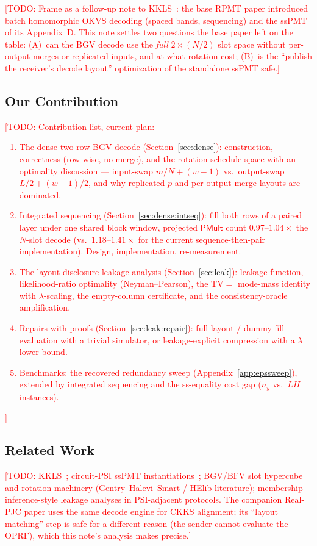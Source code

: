 \documentclass[runningheads]{llncs}
\newcommand{\TODO}[1]{\textcolor{red}{[TODO: #1]}}
\newcommand{\PMult}{\mathsf{PMult}}          %
\newcommand{\band}{w}                        %
\newcommand{\half}{H}                        %
\newcommand{\TV}{\mathrm{TV}}
\begin{document}
\TODO{Frame as a follow-up note to KKLS~\cite{EPRINT:KwaKwoLeeSon26}: the base RPMT
paper introduced batch homomorphic OKVS decoding (spaced bands, sequencing) and the
ssPMT of its Appendix~D. This note settles two questions the base paper left on the
table: (A)~can the BGV decode use the \emph{full} $2\times(N/2)$ slot space without
per-output merges or replicated inputs, and at what rotation cost; (B)~is the
``publish the receiver's decode layout'' optimization of the standalone ssPMT safe.}

\subsection{Our Contribution}
\label{sec:intro:contrib}

\TODO{Contribution list, current plan:
\begin{enumerate}
  \item The dense two-row BGV decode (Section~\ref{sec:dense}): construction,
  correctness (row-wise, no merge), and the rotation-schedule space with an
  optimality discussion --- input-swap $m/N+(\band{-}1)$ vs.\ output-swap
  $L/2+(\band{-}1)/2$, and why replicated-$p$ and per-output-merge layouts are
  dominated.
  \item Integrated sequencing (Section~\ref{sec:dense:intseq}): fill both rows of a
  paired layer under one shared block window, projected $\PMult$ count
  $0.97$--$1.04\times$ the $N$-slot decode (vs.\ $1.18$--$1.41\times$ for the current
  sequence-then-pair implementation). Design, implementation, re-measurement.
  \item The layout-disclosure leakage analysis (Section~\ref{sec:leak}): leakage
  function, likelihood-ratio optimality (Neyman--Pearson), the
  $\TV=$ mode-mass identity with $\lambda$-scaling, the empty-column certificate, and
  the consistency-oracle amplification.
  \item Repairs with proofs (Section~\ref{sec:leak:repair}): full-layout /
  dummy-fill evaluation with a trivial simulator, or leakage-explicit compression
  with a $\lambda$ lower bound.
  \item Benchmarks: the recovered redundancy sweep (Appendix~\ref{app:epssweep}),
  extended by integrated sequencing and the ss-equality cost gap ($n_y$ vs.\
  $L\half$ instances).
\end{enumerate}}

\subsection{Related Work}
\label{sec:intro:related}
\TODO{KKLS~\cite{EPRINT:KwaKwoLeeSon26}; circuit-PSI ssPMT
instantiations~\cite{EC:PSTY19,AC:LPRST21}; BGV/BFV slot hypercube and rotation
machinery (Gentry--Halevi--Smart / HElib literature); membership-inference-style
leakage analyses in PSI-adjacent protocols. The companion Real-PJC paper uses the
same decode engine for CKKS alignment; its ``layout matching'' step is safe for a
different reason (the sender cannot evaluate the OPRF), which this note's analysis
makes precise.}
\end{document}
